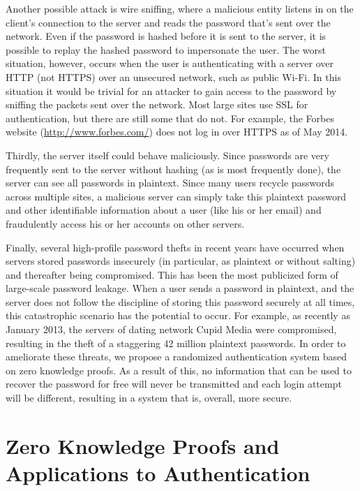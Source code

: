\documentclass[11pt]{article}
\begin{document}
Another possible attack is wire sniffing, where a malicious entity listens in on the client’s connection to the server and reads the password that’s sent over the network\cite{Lum}.  Even if the password is hashed before it is sent to the server, it is possible to replay the hashed password to impersonate the user.  The worst situation, however, occurs when the user is authenticating with a server over HTTP (not HTTPS) over an unsecured network, such as public Wi-Fi.  In this situation it would be trivial for an attacker to gain access to the password by sniffing the packets sent over the network. Most large sites use SSL for authentication, but there are still some that do not.  For example, the Forbes website (\url{http://www.forbes.com/}) does not log in over HTTPS as of May 2014.

Thirdly, the server itself could behave maliciously. Since passwords are very frequently sent to the server without hashing (as is most frequently done), the server can see all passwords in plaintext. Since many users recycle passwords across multiple sites, a malicious server can simply take this plaintext password and other identifiable information about a user (like his or her email) and fraudulently access his or her accounts on other servers.

Finally, several high-profile password thefts in recent years have occurred when servers stored passwords insecurely (in particular, as plaintext or without salting) and thereafter being compromised.  This has been the most publicized form of large-scale password leakage.  When a user sends a password in plaintext, and the server does not follow the discipline of storing this password securely at all times, this catastrophic scenario has the potential to occur.  For example, as recently as January 2013, the servers of dating network Cupid Media were compromised, resulting in the theft of a staggering 42 million plaintext passwords. 
In order to ameliorate these threats, we propose a randomized authentication system based on zero knowledge proofs. As a result of this, no information that can be used to recover the password for free will never be transmitted and each login attempt will be different, resulting in a system that is, overall, more secure.

\section{Zero Knowledge Proofs and Applications to Authentication}
\end{document}
